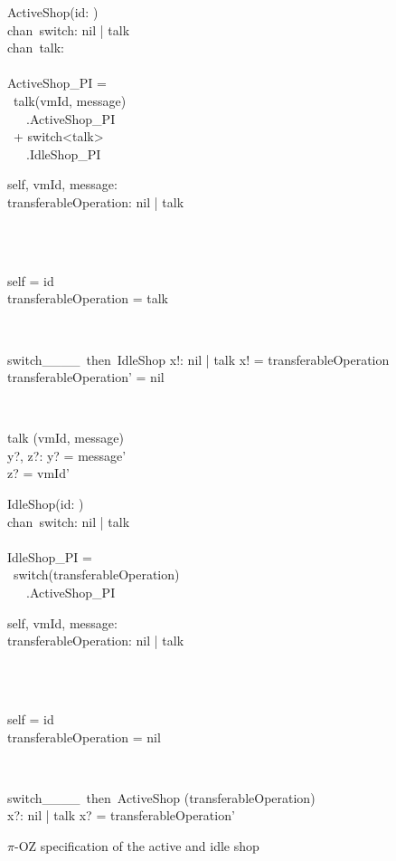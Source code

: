 \begin{figure}[H]
\centering
\begin{sidebyside}
\begin{class}{ActiveShop(id: \integer)}
\ 
\\chan\ switch: nil | talk
\ 
\\chan\ talk:\integer \times \integer
\ \\ \
\\ActiveShop\_PI = 
\\ \ talk(vmId, message)
\ \\ \ \ \ .ActiveShop\_PI
\\ \ + switch<talk>
\ \\ \ \ \ .IdleShop\_PI
\\\begin{state}
self, vmId, message: \integer
\\transferableOperation: nil | talk
\end{state} 
\\
\begin{init}
\\self = id
\\transferableOperation = talk
\end{init} 
\\
\begin{op}{switch\_\_\_\_\ then\ IdleShop}
x!: nil | talk
\ST
x! = transferableOperation
\\transferableOperation' = nil
\end{op}
\\
\begin{op}{talk}
\Delta (vmId, message)
\\y?, z?: \integer
\ST
y? = message'
\\z? = vmId'
\end{op}
\end{class}
\nextside
\begin{class}{IdleShop(id: \integer)}
\ 
\\chan\ switch: nil | talk
\ \\ \
\\IdleShop\_PI = 
\\ \  switch(transferableOperation)
\ \\ \ \ \ .ActiveShop\_PI
\\
\begin{state}
self, vmId, message: \integer
\\transferableOperation: nil | talk
\end{state} 
\\
\begin{init}
\\self = id
\\transferableOperation = nil
\end{init} 
\\
\begin{op}{switch\_\_\_\_\ then\ ActiveShop}
\Delta (transferableOperation)
\\x?: nil | talk
\ST
x? = transferableOperation'
\end{op}
\end{class}
\end{sidebyside}
\caption{$\pi$-OZ specification of the active and idle shop}
\label{comp_oz_pi_statefull_shop}
\end{figure}